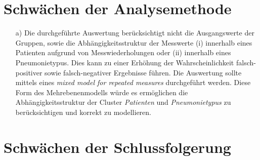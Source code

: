 \documentclass{scrartcl}
\theoremstyle{definition}
\theoremstyle{remark}
\begin{document}
\section{Schwächen der Analysemethode}
\begin{enumerate}
	\item[a) ] Die durchgeführte Auswertung berücksichtigt nicht die Ausgangswerte der Gruppen, sowie die Abhängigkeitsstruktur der Messwerte (i) innerhalb eines Patienten aufgrund von Messwiederholungen oder (ii) innerhalb eines Pneumonietypus. Dies kann zu einer Erhöhung der Wahrscheinlichkeit falsch-positiver sowie falsch-negativer Ergebnisse führen. Die Auswertung sollte mittels eines  \textit{mixed model for repeated measures} durchgeführt werden. Diese Form des Mehrebenenmodells würde es ermöglichen die Abhängigkeitsstruktur der Cluster \textit{Patienten} und \textit{Pneumonietypus} zu berücksichtigen und korrekt zu modellieren.

\end{enumerate}


\section{Schwächen der Schlussfolgerung}





%

%
%

\end{document}
